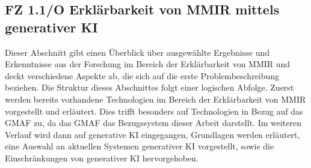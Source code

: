 \subsection[FZ 1.1/O Erklärbarkeit von MMIR mittels generativer KI]{\texorpdfstring{FZ 1.1/O Erklärbarkeit von MMIR mittels \\ generativer KI}{FZ 1.1/O Erklärbarkeit von MMIR mittels generativer KI}}
\label{sec2:sota:subsec:fz-explainability}
Dieser Abschnitt gibt einen Überblick über ausgewählte Ergebnisse und Erkenntnisse aus der Forschung im Bereich der Erklärbarkeit von MMIR und deckt verschiedene Aspekte ab, die sich auf die erste Problembeschreibung beziehen.
Die Struktur dieses Abschnittes folgt einer logischen Abfolge.
Zuerst werden bereits vorhandene Technologien im Bereich der Erklärbarkeit von MMIR vorgestellt und erläutert. 
Dies trifft besonders auf Technologien in Bezug auf das GMAF zu, da das GMAF das Bezugssystem dieser Arbeit darstellt.
Im weiteren Verlauf wird dann auf generative KI eingegangen, Grundlagen werden erläutert, eine Auswahl an aktuellen Systemen generativer KI vorgestellt, sowie die Einschränkungen von generativer KI hervorgehoben.

